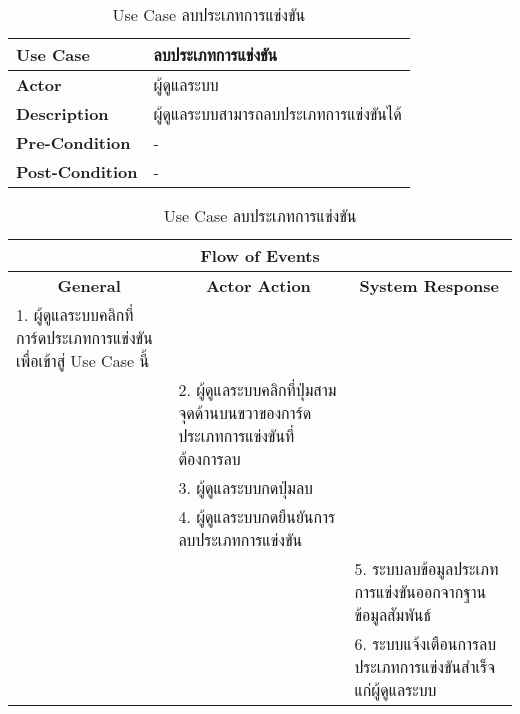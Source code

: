 \begin{table}[H]
    \caption{Use Case ลบประเภทการแข่งขัน}
    \label{tab:use-case-remove-contest}
    \begin{tabularx}{\textwidth}{ | p{3cm} | X | }
    \hline
    \textbf{Use Case} & ลบประเภทการแข่งขัน \\
    \hline
    \textbf{Actor} & ผู้ดูแลระบบ \\
    \hline
    \textbf{Description} & ผู้ดูแลระบบสามารถลบประเภทการแข่งขันได้ \\
    \hline
    \textbf{Pre-Condition} & - \\
    \hline
    \textbf{Post-Condition} & - \\
    \hline
    \end{tabularx}
    \begin{tabularx}{\textwidth}{ | X | X | X | }
    \multicolumn{3}{|c|}{\textbf{Flow of Events}} \\
    \hline
    \multicolumn{1}{|c|}{\textbf{General}} & \multicolumn{1}{|c|}{\textbf{Actor Action}} & \multicolumn{1}{|c|}{\textbf{System Response}} \\
    \hline
    1. ผู้ดูแลระบบคลิกที่การ์ดประเภทการแข่งขันเพื่อเข้าสู่ Use Case นี้ &  &  \\
    \hline
    & 2. ผู้ดูแลระบบคลิกที่ปุ่มสามจุดด้านบนขวาของการ์ดประเภทการแข่งขันที่ต้องการลบ &  \\
    \hline
    & 3. ผู้ดูแลระบบกดปุ่มลบ  &  \\
    \hline
    & 4. ผู้ดูแลระบบกดยืนยันการลบประเภทการแข่งขัน &  \\
    \hline
    & & 5. ระบบลบข้อมูลประเภทการแข่งขันออกจากฐานข้อมูลสัมพันธ์ \\
    \hline
    & & 6. ระบบแจ้งเตือนการลบประเภทการแข่งขันสำเร็จแก่ผู้ดูแลระบบ \\
    \hline
    \end{tabularx}
\end{table}

